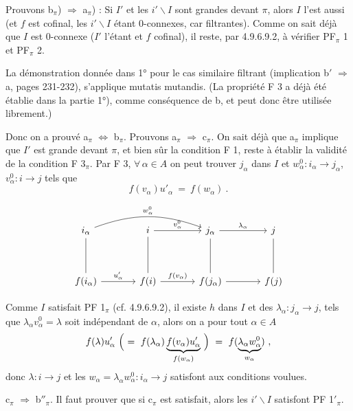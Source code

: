 \documentclass[11pt]{article}
\newcommand{\printedpage}[1]{\marginpar{\footnotesize p.~#1}}
\newcommand{\msp}[1]{\marginpar{\footnotesize [#1]}}
\begin{document}
Prouvons b$_\pi$) $\Longrightarrow$ a$_\pi$) : Si $I'$ et les $i'\backslash I$ sont grandes devant $\pi$, alors $I$ l'est aussi (et $f$ est cofinal, les $i'\backslash I$ étant 0-connexes, car filtrantes). Comme on sait déjà que $I$ est 0-connexe ($I'$ l'étant et $f$ cofinal), il reste, par 4.9.6.9.2, à vérifier PF$_\pi$ 1 et PF$_\pi$ 2.

\msp{page 240}
La démonstration donnée dans 1° pour le cas similaire filtrant (implication b$'$ $\Longrightarrow$ a, pages 231-232), s'applique mutatis mutandis. (La propriété F 3 a déjà été établie dans la partie 1°), comme conséquence de b, et peut donc être utilisée librement.)

Donc on a prouvé a$_\pi$ $\Longleftrightarrow$ b$_\pi$. Prouvons a$_\pi$ $\Longrightarrow$ c$_\pi$. On sait déjà que a$_\pi$ implique que $I'$ est grande devant $\pi$, et bien sûr la condition F 1, reste à établir la validité de la condition F 3$_\pi$. Par F 3, $\forall\, \alpha \in A$ on peut trouver $j_\alpha$ dans $I$ et $w^0_\alpha : i_\alpha \longrightarrow j_\alpha$, $v^0_\alpha : i \longrightarrow j$ tels que %
\[
f(v_\alpha)u'_\alpha \ = \ f(w_\alpha) \ .
\]

\printedpage{90}

\[
\begin{tikzcd}[column sep=large, row sep=huge]
i_\alpha \arrow[rr, bend left=20, "w^0_\alpha"] \arrow[d, dash] & i \arrow[r, "v^0_\alpha"] \arrow[d, dash] & j_\alpha \arrow[r, "\lambda_\alpha"] \arrow[d, dash] & j \arrow[d, dash] \\
f(i_\alpha) \arrow[r, "u'_\alpha"] & f(i) \arrow[r, "f(v_\alpha)"] & f(j_\alpha) \arrow[r] & f(j)
\end{tikzcd}
\]

Comme $I$ satisfait PF 1$_\pi$ (cf. 4.9.6.9.2), il existe $h$ dans $I$ et des $\lambda_\alpha : j_\alpha \longrightarrow j$, tels que $\lambda_\alpha v^0_\alpha = \lambda$ soit indépendant de $\alpha$, alors on a pour tout $\alpha \in A$ %
\[
f(\lambda)u'_\alpha \ \Bigl( \ = \ f(\lambda_\alpha)\underbrace{f(v_\alpha)u'_\alpha}_{f(w_\alpha)} \ \Bigr) \ = \ f(\underbrace{\lambda_\alpha w^0_\alpha}_{w_\alpha}) \ ,
\]
donc $\lambda : i \longrightarrow j$ et les $w_\alpha = \lambda_\alpha w^0_\alpha : i_\alpha \longrightarrow j$ satisfont aux conditions voulues.

c$_\pi$ $\Longrightarrow$ b$''_\pi$. Il faut prouver que si c$_\pi$ est satisfait, alors les $i'\backslash I$ satisfont PF 1$'_\pi$.
\end{document}
